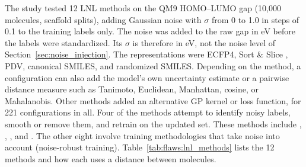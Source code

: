 The study tested 12 LNL methods on the QM9 HOMO--LUMO gap (10,000 molecules, scaffold splits), adding Gaussian noise with $\sigma$ from 0 to 1.0 in steps of 0.1 to the training labels only. The noise was added to the raw gap in eV before the labels were standardized. Its $\sigma$ is therefore in eV, not the noise level of Section~\ref{sec:noise_injection}. The representations were ECFP4, Sort \& Slice \citep{sns}, PDV, canonical SMILES, and randomized SMILES. Depending on the method, a configuration can also add the model's own uncertainty estimate or a pairwise distance measure such as Tanimoto, Euclidean, Manhattan, cosine, or Mahalanobis. Other methods added an alternative GP kernel or loss function, for 221 configurations in all. Four of the methods attempt to identify noisy labels, smooth or remove them, and retrain on the updated set. These methods include , , , and . The other eight involve training methodologies that take noise into account (noise-robust training). Table~\ref{tab:flaws:lnl_methods} lists the 12 methods and how each uses a distance between molecules.


